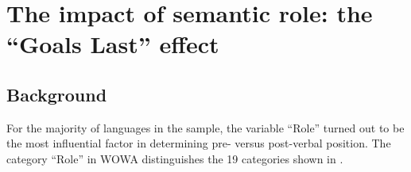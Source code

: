 \documentclass[output=paper,colorlinks,citecolor=brown,collectionchapter]{langscibook}
\begin{document}
\section{The impact of semantic role: the ``Goals Last'' effect}\label{Intro:ss:4}

\subsection{Background}\label{Intro:ss:4.1}

For the majority of languages in the sample, the variable ``Role'' turned out to be the most influential factor in determining pre- versus post-verbal position. The category ``Role'' in WOWA distinguishes the 19 categories shown in .


 \label{Intro:extab:3}
\end{document}
